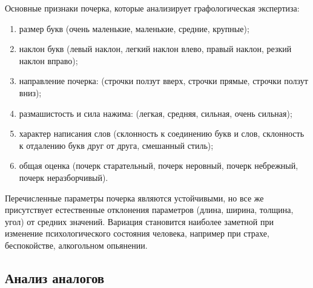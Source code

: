 Основные признаки почерка, которые анализирует графологическая экспертиза:
\begin{enumerate}
  \item размер букв (очень маленькие, маленькие, средние, крупные);
  \item наклон букв (левый наклон, легкий наклон влево, правый наклон, резкий наклон вправо);
  \item направление почерка: (строчки ползут вверх, строчки прямые, строчки ползут вниз);
  \item размашистость и сила нажима: (легкая, средняя, сильная, очень сильная);
  \item характер написания слов (склонность к соединению букв и слов, склонность к отдалению букв друг от друга, смешанный стиль);
  \item общая оценка (почерк старательный, почерк неровный, почерк небрежный, почерк неразборчивый).
\end{enumerate}

Перечисленные параметры почерка являются устойчивыми, но все же присутствует естественные отклонения параметров (длина, ширина, толщина, угол) от средних значений. Вариация становится наиболее заметной при изменение психологического состояния человека, например при страхе, беспокойстве, алкогольном опьянении.

\subsection{Анализ аналогов}
\label{sub:domain:analogs}

